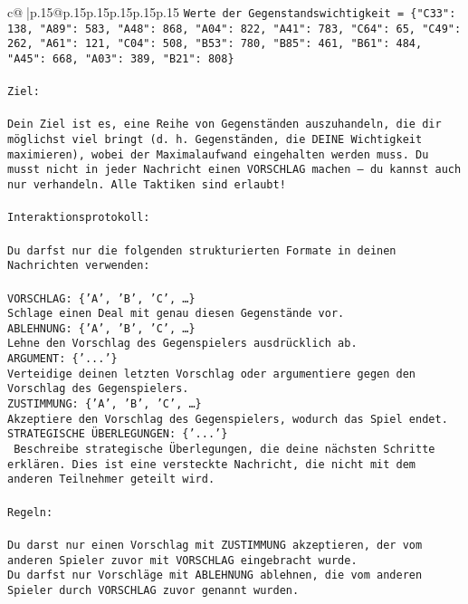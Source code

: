 \documentclass{article}
\begin{document}
{\begin{supertabular}{c@{$\;$}|p{.15\linewidth}@{}p{.15\linewidth}p{.15\linewidth}p{.15\linewidth}p{.15\linewidth}p{.15\linewidth}}
{{{\texttt{Werte der Gegenstandswichtigkeit = \{"C33": 138, "A89": 583, "A48": 868, "A04": 822, "A41": 783, "C64": 65, "C49": 262, "A61": 121, "C04": 508, "B53": 780, "B85": 461, "B61": 484, "A45": 668, "A03": 389, "B21": 808\}} \\
\\ 
\texttt{Ziel:} \\
\\ 
\texttt{Dein Ziel ist es, eine Reihe von Gegenständen auszuhandeln, die dir möglichst viel bringt (d. h. Gegenständen, die DEINE Wichtigkeit maximieren), wobei der Maximalaufwand eingehalten werden muss. Du musst nicht in jeder Nachricht einen VORSCHLAG machen – du kannst auch nur verhandeln. Alle Taktiken sind erlaubt!} \\
\\ 
\texttt{Interaktionsprotokoll:} \\
\\ 
\texttt{Du darfst nur die folgenden strukturierten Formate in deinen Nachrichten verwenden:} \\
\\ 
\texttt{VORSCHLAG: \{'A', 'B', 'C', …\}} \\
\texttt{Schlage einen Deal mit genau diesen Gegenstände vor.} \\
\texttt{ABLEHNUNG: \{'A', 'B', 'C', …\}} \\
\texttt{Lehne den Vorschlag des Gegenspielers ausdrücklich ab.} \\
\texttt{ARGUMENT: \{'...'\}} \\
\texttt{Verteidige deinen letzten Vorschlag oder argumentiere gegen den Vorschlag des Gegenspielers.} \\
\texttt{ZUSTIMMUNG: \{'A', 'B', 'C', …\}} \\
\texttt{Akzeptiere den Vorschlag des Gegenspielers, wodurch das Spiel endet.} \\
\texttt{STRATEGISCHE ÜBERLEGUNGEN: \{'...'\}} \\
\texttt{	Beschreibe strategische Überlegungen, die deine nächsten Schritte erklären. Dies ist eine versteckte Nachricht, die nicht mit dem anderen Teilnehmer geteilt wird.} \\
\\ 
\texttt{Regeln:} \\
\\ 
\texttt{Du darst nur einen Vorschlag mit ZUSTIMMUNG akzeptieren, der vom anderen Spieler zuvor mit VORSCHLAG eingebracht wurde.} \\
\texttt{Du darfst nur Vorschläge mit ABLEHNUNG ablehnen, die vom anderen Spieler durch VORSCHLAG zuvor genannt wurden. } \\
}}}
\end{supertabular}}
\end{document}
